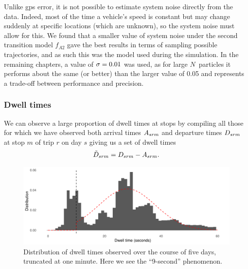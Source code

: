 Unlike \gls{gps} error, it is not possible to estimate system noise directly from the data. Indeed, most of the time a vehicle's speed is constant but may change suddenly at specific locations (which are unknown), so the system noise must allow for this. We found that a smaller value of system noise under the second transition model $f_{A2}$ gave the best results in terms of sampling possible trajectories, and as such this was the model used during the simulation. In the remaining chapters, a value of $\sigma = 0.01$ was used, as for large $N$~particles it performs about the same (or better) than the larger value of 0.05 and represents a trade-off between performance and precision.



\subsubsection{Dwell times}
\label{sec:pf_params_dwell}

We can observe a large proportion of dwell times at stops by compiling all those for which we have observed both arrival times $A_{srm}$ and departure times $D_{srm}$ at stop $m$ of trip $r$ on day $s$ giving us a set of dwell times
\begin{equation}
\label{eq:dwell_time_obs}
\tilde{D}_{srm} = D_{srm} - A_{srm}.
\end{equation}

\begin{knitrout}\small
{}\color{fgcolor}\begin{figure}
\includegraphics[width=\linewidth]{figure/observed_dwell-1} \caption[Distribution of dwell times at stops and the ``9-second'' phenomenon]{Distribution of dwell times observed over the course of five days, truncated at one minute. Here we see the ``9-second'' phenomenon.}\label{fig:observed_dwell}
\end{figure}


\end{knitrout}


